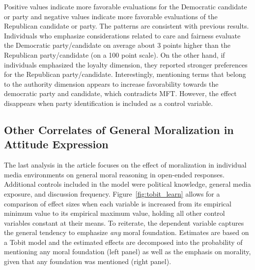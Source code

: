 \documentclass[12pt]{article}
\begin{document}
Positive values indicate more favorable evaluations for the Democratic candidate or party and negative values indicate more favorable evaluations of the Republican candidate or party. The patterns are consistent with previous results. Individuals who emphasize considerations related to care and fairness evaluate the Democratic party/candidate on average about 3 points higher than the Republican party/candidate (on a 100 point scale). On the other hand, if individuals emphasized the loyalty dimension, they reported stronger preferences for the Republican party/candidate. Interestingly, mentioning terms that belong to the authority dimension appears to increase favorability towards the democratic party and candidate, which contradicts MFT. However, the effect disappears when party identification is included as a control variable.



\clearpage
\subsection{Other Correlates of General Moralization in Attitude Expression}

The last analysis in the article focuses on the effect of moralization in individual media environments on general moral reasoning in open-ended responses. Additional controls included in the model were political knowledge, general media exposure, and discussion frequency. Figure~\ref{fig:tobit_learn} allows for a comparison of effect sizes when each variable is increased from its empirical minimum value to its empirical maximum value, holding all other control variables constant at their means. To reiterate, the dependent variable captures the general tendency to emphasize \textit{any} moral foundation. Estimates are based on a Tobit model and the estimated effects are decomposed into the probability of mentioning any moral foundation (left panel) as well as the emphasis on morality, given that any foundation was mentioned (right panel).
\end{document}
